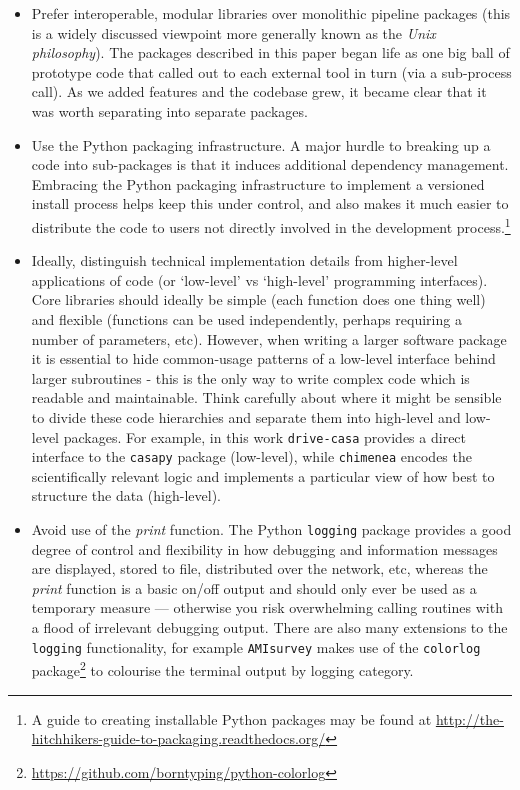 \documentclass[5p,authoryear]{elsarticle}
\begin{document}
\begin{itemize}
 \item Prefer interoperable, modular libraries over monolithic pipeline packages 
  (this is a widely discussed viewpoint more generally known as the \textit{Unix philosophy}). 
  The packages described in this paper began life as one big ball of prototype code that called out to each external tool in turn (via a sub-process call).
  As we added features and the codebase grew, it became clear that it was worth separating into separate packages.
  
 \item Use the Python packaging infrastructure. 
  A major hurdle to breaking up a code into sub-packages is that it induces additional dependency management.
  Embracing the Python packaging infrastructure to implement a versioned install process helps keep this under control, and also makes it much easier to distribute the code to users not directly involved in the development 
  process.\footnote{A guide to creating installable Python packages may be found at \href{http://the-hitchhikers-guide-to-packaging.readthedocs.org/}{\url{http://the-hitchhikers-guide-to-packaging.readthedocs.org/}}}

 \item Ideally, distinguish technical implementation details from higher-level applications of code (or `low-level' vs `high-level' programming interfaces). 
    Core libraries should ideally be simple (each function does one thing well) and flexible (functions can be used independently, perhaps requiring a number of parameters, etc).
  However, when writing a larger software package it is essential to hide common-usage patterns of a low-level interface behind larger subroutines - this is the only way to write complex code which is readable and maintainable. 
   Think carefully about where it might be sensible to divide these code hierarchies and separate them into high-level and low-level packages. For example, in this work \texttt{drive-casa} provides a direct interface to the \texttt{casapy} package (low-level), while \texttt{chimenea} encodes the scientifically relevant logic and implements a particular view of how best to structure the data (high-level).

 \item Avoid use of the \textit{print} function. 
    The Python \texttt{logging} package provides a good degree of control and flexibility in how debugging and information messages are displayed, stored to file, distributed over the network, etc, whereas the \textit{print} function is a basic on/off output and should only ever be used as a temporary measure --- otherwise you risk overwhelming calling routines with a flood of irrelevant debugging output.
    There are also many extensions to the \texttt{logging} functionality, for example \texttt{AMIsurvey} makes use of the 
  \texttt{colorlog} package\footnote{\href{https://github.com/borntyping/python-colorlog}{\url{https://github.com/borntyping/python-colorlog}}} 
to colourise the terminal output by logging category.


\end{itemize}
\end{document}
